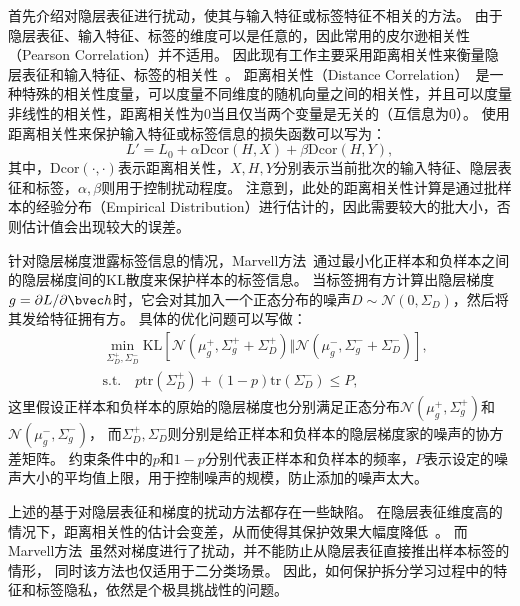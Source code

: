 首先介绍对隐层表征进行扰动，使其与输入特征或标签特征不相关的方法。
%
由于隐层表征、输入特征、标签的维度可以是任意的，因此常用的皮尔逊相关性（Pearson Correlation）并不适用。
%
因此现有工作主要采用距离相关性来衡量隐层表征和输入特征、标签的相关性~\cite{vepakomma2020nopeek,sunjiankai2022forward_embedding_protect}。
%
距离相关性（Distance Correlation）~\cite{szekely2007dcor,szekely2009brownian_dcor}是一种特殊的相关性度量，可以度量不同维度的随机向量之间的相关性，并且可以度量非线性的相关性，距离相关性为0当且仅当两个变量是无关的（互信息为0）。
%
使用距离相关性来保护输入特征或标签信息的损失函数可以写为：
\begin{equation}
    L' = L_0 + \alpha \text{Dcor}(H, X) + \beta \text{Dcor}(H, Y),
\end{equation}
其中，$\text{Dcor}(\cdot, \cdot)$表示距离相关性，$X,H,Y$分别表示当前批次的输入特征、隐层表征和标签，$\alpha,\beta$则用于控制扰动程度。
%
注意到，此处的距离相关性计算是通过批样本的经验分布（Empirical Distribution）进行估计的，因此需要较大的批大小，否则估计值会出现较大的误差。
%

针对隐层梯度泄露标签信息的情况，Marvell方法~\cite{oscarli2022label_defense_marvell}通过最小化正样本和负样本之间的隐层梯度间的KL散度来保护样本的标签信息。
%
当标签拥有方计算出隐层梯度$g = \partial L/\partial \bvec h$时，它会对其加入一个正态分布的噪声$D \sim \mathcal N(0, \Sigma_D)$，然后将其发给特征拥有方。
%
具体的优化问题可以写做：
\begin{equation}
\begin{split}
\label{eq:related_work:marvell}
    & \min_{\Sigma_D^+,\Sigma_D^-} \text{KL}\left[\mathcal N(\mu_g^+, \Sigma_g^+ + \Sigma_D^+)\Vert\mathcal N(\mu_g^-, \Sigma_g^- + \Sigma_D^-)\right],
    \\
    & \text{s.t.}\quad p\text{tr}(\Sigma_D^+) + (1-p)\text{tr}(\Sigma_D^-) \le P,
\end{split}
\end{equation}
这里假设正样本和负样本的原始的隐层梯度也分别满足正态分布$\mathcal N(\mu_g^+, \Sigma_g^+)$和$\mathcal N(\mu_g^-, \Sigma_g^-)$，
而$\Sigma_D^+,\Sigma_D^-$则分别是给正样本和负样本的隐层梯度家的噪声的协方差矩阵。
%
约束条件中的$p$和$1-p$分别代表正样本和负样本的频率，$P$表示设定的噪声大小的平均值上限，用于控制噪声的规模，防止添加的噪声太大。
%


上述的基于对隐层表征和梯度的扰动方法都存在一些缺陷。
%
在隐层表征维度高的情况下，距离相关性的估计会变差，从而使得其保护效果大幅度降低~\cite{erdogan2022unsplit}。
%
而Marvell方法~\cite{sunjiankai2022forward_embedding_protect}虽然对梯度进行了扰动，并不能防止从隐层表征直接推出样本标签的情形，
同时该方法也仅适用于二分类场景。
%
因此，如何保护拆分学习过程中的特征和标签隐私，依然是个极具挑战性的问题。


